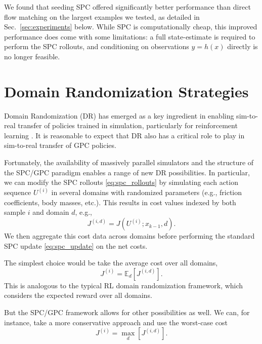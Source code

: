 \documentclass[letterpaper, 10 pt]{ieeeconf}
\begin{document}
We found that seeding SPC offered significantly better performance than direct flow matching on the largest examples we tested, as detailed in Sec.~\ref{sec:experiments} below. While SPC is computationally cheap, this improved performance does come with some limitations: a full state-estimate is required to perform the SPC rollouts, and conditioning on observations $y = h(x)$ directly is no longer feasible. 

\section{Domain Randomization Strategies}\label{sec:online_dr}

Domain Randomization (DR) has emerged as a key ingredient in enabling sim-to-real transfer of policies trained in simulation, particularly for reinforcement learning \cite{handa2023dextreme, tobin2017domain}. It is reasonable to expect that DR also has a critical role to play in sim-to-real transfer of GPC policies.

Fortunately, the availability of massively parallel simulators and the structure of the SPC/GPC paradigm enables a range of new DR possibilities. In particular, we can modify the SPC rollouts \eqref{eq:spc_rollouts} by simulating each action sequence $U^{(i)}$ in several domains with randomized parameters (e.g., friction coefficients, body masses, etc.). This results in cost values indexed by both sample $i$ and domain $d$, e.g.,
\begin{equation}
    J^{(i, d)} = J(U^{(i)}; x_{k-1}, d).
\end{equation}
We then aggregate this cost data across domains before performing the standard SPC update \eqref{eq:spc_update} on the net costs. 

The simplest choice would be take the average cost over all domains,
\begin{equation}\label{eq:average_dr}
    J^{(i)} = \mathbb{E}_d \left[ J^{(i, d)} \right].
\end{equation}
This is analogous to the typical RL domain randomization framework, which considers the expected reward over all domains. 

But the SPC/GPC framework allows for other possibilities as well. We can, for instance, take a more conservative approach and use the worst-case cost
\begin{equation}
    J^{(i)} = \max_d \left[ J^{(i, d)} \right].
\end{equation}
\end{document}
